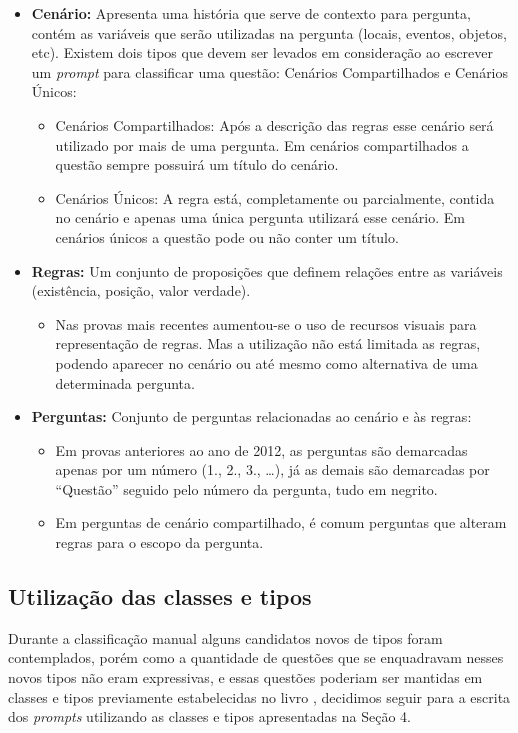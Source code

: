 \documentclass[12pt]{article}
\begin{document}
    \begin{itemize}
        \item \textbf{Cenário:} Apresenta uma história que serve de contexto para pergunta, contém as variáveis que serão utilizadas na pergunta (locais, eventos, objetos, etc).
        Existem dois tipos que devem ser levados em consideração ao escrever um \textit{\textit{prompt}} para classificar uma questão: Cenários Compartilhados e Cenários Únicos:
        \begin{itemize}
            \item Cenários Compartilhados: Após a descrição das regras esse cenário será utilizado por mais de uma pergunta. Em cenários compartilhados a questão sempre possuirá um título do cenário.
            \item Cenários Únicos: A regra está, completamente ou parcialmente, contida no cenário e apenas uma única pergunta utilizará esse cenário. Em cenários únicos a questão pode ou não conter um título.
        \end{itemize}
        \item \textbf{Regras:} Um conjunto de proposições que definem relações entre as variáveis (existência, posição, valor verdade).
        \begin{itemize}
            \item Nas provas mais recentes aumentou-se o uso de recursos visuais para representação de regras. Mas a utilização não está limitada as regras, podendo aparecer no cenário ou até mesmo como alternativa de uma determinada pergunta.
        \end{itemize}
        \item \textbf{Perguntas:} Conjunto de perguntas relacionadas ao cenário e às regras:
        \begin{itemize}
            \item Em provas anteriores ao ano de 2012, as perguntas são demarcadas apenas por um número (1., 2., 3., …), já as demais são demarcadas por “Questão” seguido pelo número da pergunta, tudo em negrito.
            \item Em perguntas de cenário compartilhado, é comum perguntas que alteram regras para o escopo da pergunta.
        \end{itemize}
    \end{itemize}

\subsection{Utilização das classes e tipos}
Durante a classificação manual alguns candidatos novos de tipos foram contemplados, porém como a quantidade de questões que se enquadravam nesses novos tipos não eram expressivas, e essas questões poderiam ser mantidas em classes e tipos previamente estabelecidas no livro \cite{book1}, decidimos seguir para a escrita dos \textit{prompts} utilizando as classes e tipos apresentadas na Seção 4.
\end{document}

